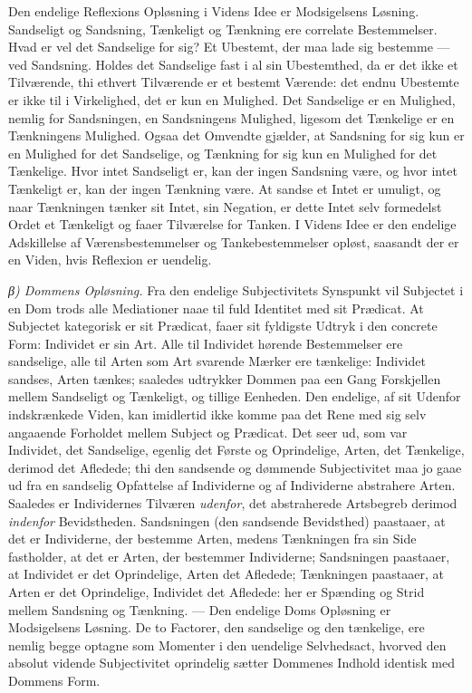 \documentclass[12pt]{book}
\newcommand{\apage}[1]{\marginnote{\footnotesize\textit{[#1]}}}
\begin{document}
Den endelige Reflexions Opløsning i Videns Idee er Modsigelsens Løsning.
Sandseligt og Sandsning, Tænkeligt og Tænkning ere correlate Bestemmelser.
Hvad er vel det Sandselige for sig? Et Ubestemt, der maa lade sig bestemme
--- ved Sandsning. Holdes det Sandselige fast i al sin Ubestemthed, da er
det ikke et Tilværende, thi ethvert Tilværende er et bestemt Værende: det
endnu Ubestemte er ikke til i Virkelighed, det er kun en Mulighed. Det
Sandselige er en Mulighed, nemlig for Sandsningen, en Sandsningens
Mulighed, ligesom det Tænkelige er en Tænkningens Mulighed. Ogsaa det
Omvendte gjælder, at Sandsning for sig kun er en Mulighed for det
Sandselige, og Tænkning for sig kun en Mulighed for det Tænkelige. Hvor
intet Sandseligt er, kan der ingen Sandsning være, og hvor intet Tænkeligt
er, kan der ingen Tænkning \apage{107} være. At sandse et Intet er umuligt, og naar
Tænkningen tænker sit Intet, sin Negation, er dette Intet selv formedelst
Ordet et Tænkeligt og faaer Tilværelse for Tanken. I Videns Idee er den
endelige Adskillelse af Værensbestemmelser og Tankebestemmelser opløst,
saasandt der er en Viden, hvis Reflexion er uendelig.

\emph{β) Dommens Opløsning.} Fra den endelige Subjectivitets Synspunkt vil
Subjectet i en Dom trods alle Mediationer naae til fuld Identitet med sit
Prædicat. At Subjectet kategorisk er sit Prædicat, faaer sit fyldigste
Udtryk i den concrete Form: Individet er sin Art. Alle til Individet hørende
Bestemmelser ere sandselige, alle til Arten som Art svarende Mærker ere
tænkelige: Individet sandses, Arten tænkes; saaledes udtrykker Dommen paa
een Gang Forskjellen mellem Sandseligt og Tænkeligt, og tillige Eenheden.
Den endelige, af sit Udenfor indskrænkede Viden, kan imidlertid ikke komme
paa det Rene med sig selv angaaende Forholdet mellem Subject og Prædicat.
Det seer ud, som var Individet, det Sandselige, egenlig det Første og
Oprindelige, Arten, det Tænkelige, derimod det Afledede; thi den sandsende
og dømmende Subjectivitet maa jo gaae ud fra en sandselig Opfattelse af
Individerne og af Individerne abstrahere Arten. Saaledes er Individernes
Tilværen \emph{udenfor}, det abstraherede Artsbegreb derimod \emph{indenfor} Bevidstheden.
Sandsningen (den sandsende Bevidsthed) paastaaer, at det er Individerne, der
bestemme Arten, medens Tænkningen fra sin Side fastholder, at det er Arten,
der bestemmer Individerne; Sandsningen paastaaer, at \apage{108} Individet er det
Oprindelige, Arten det Afledede; Tænkningen paastaaer, at Arten er det
Oprindelige, Individet det Afledede: her er Spænding og Strid mellem
Sandsning og Tænkning. --- Den endelige Doms Opløsning er Modsigelsens Løsning.
De to Factorer, den sandselige og den tænkelige, ere nemlig begge optagne
som Momenter i den uendelige Selvhedsact, hvorved den absolut vidende
Subjectivitet oprindelig sætter Dommenes Indhold identisk med Dommens Form.
\end{document}
